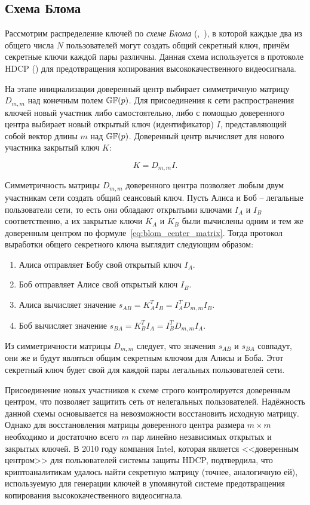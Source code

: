 \subsection{Схема Блома}

Рассмотрим распределение ключей по \emph{схеме Блома} (,~\cite{Blom:1984, Blom:1985}), в которой каждые два  из общего числа $N$ пользователей могут создать общий секретный ключ, причём секретные ключи каждой пары различны. Данная схема используется в протоколе HDCP () для предотвращения копирования высококачественного видеосигнала.

На этапе инициализации доверенный центр выбирает симметричную матрицу $D_{m,m}$ над конечным полем $\mathbb{GF}(p)$. Для присоединения к сети распространения ключей новый участник либо самостоятельно, либо с помощью доверенного центра выбирает новый открытый ключ (идентификатор) $I$, представляющий собой вектор длины $m$ над $\mathbb{GF}(p)$. Доверенный центр вычисляет для нового участника закрытый ключ $K$:

\begin{equation}
	K = D_{m,m} I.
	\label{eq:blom_center_matrix}
\end{equation}

Симметричность матрицы $D_{m,m}$ доверенного центра позволяет любым двум участникам сети создать общий сеансовый ключ. Пусть Алиса и Боб -- легальные пользователи сети, то есть они обладают открытыми ключами $I_A$ и $I_B$ соответственно, а их закрытые ключи $K_A$ и $K_B$ были вычислены одним и тем же доверенным центром по формуле~\ref{eq:blom_center_matrix}. Тогда протокол выработки общего секретного ключа выглядит следующим образом:

\begin{enumerate}
	\item Алиса отправляет Бобу свой открытый ключ $I_A$.
	\item Боб отправляет Алисе свой открытый ключ $I_B$.
	\item Алиса вычисляет значение $s_{AB} = K^T_A I_B = I^T_A D_{m,m} I_B$.
	\item Боб вычисляет значение $s_{BA} = K^T_B I_A = I^T_B D_{m,m} I_A$.
\end{enumerate}

Из симметричности матрицы $D_{m,m}$ следует, что значения $s_{AB}$ и $s_{BA}$ совпадут, они же и будут являться общим секретным ключом для Алисы и Боба. Этот секретный ключ будет свой для каждой пары легальных пользователей сети.

Присоединение новых участников к схеме строго контролируется доверенным центром, что позволяет защитить сеть от нелегальных пользователей. Надёжность данной схемы основывается на невозможности восстановить исходную матрицу. Однако для восстановления матрицы доверенного центра размера $m \times m$ необходимо и достаточно всего $m$ пар линейно независимых открытых и закрытых ключей. В 2010 году компания Intel, которая является <<доверенным центром>> для пользователей системы защиты HDCP, подтвердила, что криптоаналитикам удалось найти секретную матрицу (точнее, аналогичную ей), используемую для генерации ключей в упомянутой системе предотвращения копирования высококачественного видеосигнала.

